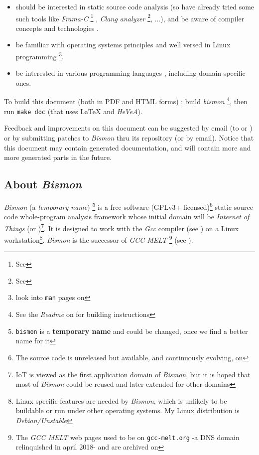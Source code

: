 \begin{itemize}
\item should be interested in static source code analysis (so have
  already tried some such tools like \emph{Frama-C} \footnote{See
    } \cite{Cuoq:2012:Frama-C}, \emph{Clang
    analyzer} \footnote{See },
  ...), and be aware of compiler concepts and technologies \cite{Aho:2006:DragonBook}.

\item be familiar with operating systems principles
  \cite{Tanenbaum:92:OS,ArpaciDusseau14-Book} and well
  versed in Linux programming
  \cite{Mitchell:2001:ALP,Kerrisk:2010:LinuxProgramming} \footnote{look
    into \texttt{man} pages on
    }.

  \item be interested in various programming languages
    \cite{Abelson1996:SICP,Scott:2007:PLP,Queinnec:1996:LSP},
    including domain specific ones.

\end{itemize}


To build this document (both in PDF and HTML forms) : build
\emph{bismon} \footnote{See the \emph{Readme} on
   for building
  instructions}, then run \texttt{make doc} (that uses {\LaTeX} and
\emph{HeVeA}).

Feedback and improvements on this document can be suggested by email
(to  or
) or by submitting patches to
\textit{Bismon} thru its  repository
(or by email). Notice that this document may contain generated
documentation, and will contain more and more generated parts in the
future.

\subsection{About \textit{Bismon}}

\textit{Bismon} (a \emph{temporary name}) \footnote{\texttt{bismon} is a \textbf{temporary name}
  and could be changed, once we find a better name for it} is a free
software (GPLv3+ licensed)\footnote{The source code is unreleased but available, and continuously evolving, on } static source code whole-program analysis framework whose
initial domain will be \emph{Internet of Things} (or
)\footnote{IoT is viewed as the first application
  domain of \textit{Bismon}, but it is hoped that most of
  \textit{Bismon} could be reused and later extended for other
  domains}. It is designed to work with the \textit{Gcc} compiler (see
) on a Linux workstation\footnote{Linux specific features are needed by \textit{Bismon}, which is unlikely to be buildable or run under other operating systems. My Linux distribution is \emph{Debian/Unstable}}. \textit{Bismon} is the
successor of \textit{GCC MELT} \footnote{The \textit{GCC MELT} web
  pages used to be on \texttt{gcc-melt.org} -a DNS domain relinquished
  in april 2018- and are archived on
  } (see \cite{Starynkevitch2007Multistage, starynkevitch-DSL2011}).

